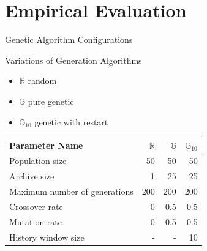 \documentclass{beamer}
\newcommand{\Random}{\mathbb{R}}
\newcommand{\Genetic}{\mathbb{G}}
\newcommand{\RGenetic}{\mathbb{G}_{10}}
\begin{document}
\section{Empirical Evaluation}

\begin{frame}{Genetic Algorithm Configurations}

\begin{block}{Variations of Generation Algorithms}
\begin{itemize}
\item $\Random$  random
\item $\Genetic$  pure genetic
\item $\RGenetic$ genetic with restart
\end{itemize}

\end{block}

\begin{table}[!t]
  \footnotesize
  \centering
  \begin{tabular}{l|r|r|r}
    \toprule
    \textbf{Parameter Name} &$\Random$&$\Genetic$ &$\RGenetic$ \\
    \hline
    Population size                   & 50  & 50  & 50  \\
    Archive size                      & 1   & 25  & 25  \\
    Maximum number of generations     & 200 & 200 & 200 \\
    Crossover rate                    & 0   & 0.5 & 0.5 \\
    Mutation rate                     & 0   & 0.5 & 0.5 \\
    History window size               & -   & -   & 10  \\
    \bottomrule
  \end{tabular}
\end{table}
\end{frame}
\end{document}
